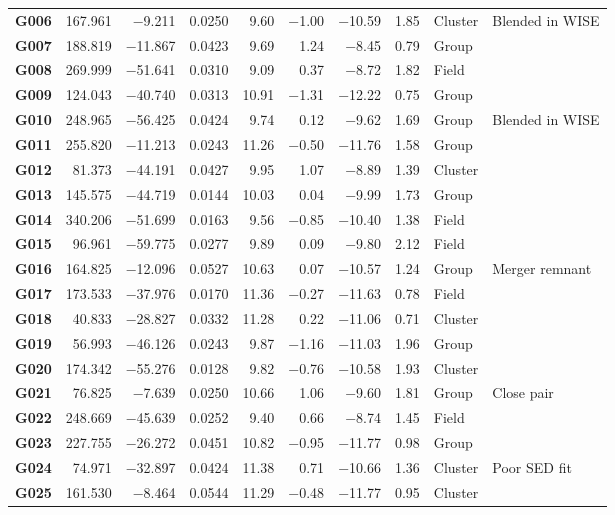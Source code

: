 \begin{landscape}
\begin{longcompact}
\begin{longtable}{l r r r r r r r l l}
\textbf{G006} & 167.961 & −9.211 & 0.0250 & 9.60 & −1.00 & −10.59 & 1.85 & Cluster & Blended in WISE \\
\textbf{G007} & 188.819 & −11.867 & 0.0423 & 9.69 & 1.24 & −8.45 & 0.79 & Group &  \\
\textbf{G008} & 269.999 & −51.641 & 0.0310 & 9.09 & 0.37 & −8.72 & 1.82 & Field &  \\
\textbf{G009} & 124.043 & −40.740 & 0.0313 & 10.91 & −1.31 & −12.22 & 0.75 & Group &  \\
\textbf{G010} & 248.965 & −56.425 & 0.0424 & 9.74 & 0.12 & −9.62 & 1.69 & Group & Blended in WISE \\
\textbf{G011} & 255.820 & −11.213 & 0.0243 & 11.26 & −0.50 & −11.76 & 1.58 & Group &  \\
\textbf{G012} & 81.373 & −44.191 & 0.0427 & 9.95 & 1.07 & −8.89 & 1.39 & Cluster &  \\
\textbf{G013} & 145.575 & −44.719 & 0.0144 & 10.03 & 0.04 & −9.99 & 1.73 & Group &  \\
\textbf{G014} & 340.206 & −51.699 & 0.0163 & 9.56 & −0.85 & −10.40 & 1.38 & Field &  \\
\textbf{G015} & 96.961 & −59.775 & 0.0277 & 9.89 & 0.09 & −9.80 & 2.12 & Field &  \\
\textbf{G016} & 164.825 & −12.096 & 0.0527 & 10.63 & 0.07 & −10.57 & 1.24 & Group & Merger remnant \\
\textbf{G017} & 173.533 & −37.976 & 0.0170 & 11.36 & −0.27 & −11.63 & 0.78 & Field &  \\
\textbf{G018} & 40.833 & −28.827 & 0.0332 & 11.28 & 0.22 & −11.06 & 0.71 & Cluster &  \\
\textbf{G019} & 56.993 & −46.126 & 0.0243 & 9.87 & −1.16 & −11.03 & 1.96 & Group &  \\
\textbf{G020} & 174.342 & −55.276 & 0.0128 & 9.82 & −0.76 & −10.58 & 1.93 & Cluster &  \\
\textbf{G021} & 76.825 & −7.639 & 0.0250 & 10.66 & 1.06 & −9.60 & 1.81 & Group & Close pair \\
\textbf{G022} & 248.669 & −45.639 & 0.0252 & 9.40 & 0.66 & −8.74 & 1.45 & Field &  \\
\textbf{G023} & 227.755 & −26.272 & 0.0451 & 10.82 & −0.95 & −11.77 & 0.98 & Group &  \\
\textbf{G024} & 74.971 & −32.897 & 0.0424 & 11.38 & 0.71 & −10.66 & 1.36 & Cluster & Poor SED fit \\
\textbf{G025} & 161.530 & −8.464 & 0.0544 & 11.29 & −0.48 & −11.77 & 0.95 & Cluster &  \\

\end{longtable}
\end{longcompact}
\end{landscape}
